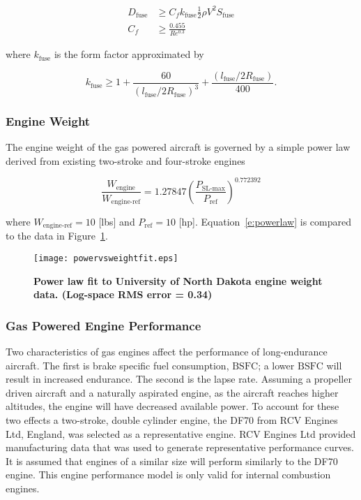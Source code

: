 \begin{align}
    \label{e:fusedrag}
    D_{\text{fuse}} &\geq C_f k_{\text{fuse}} \frac{1}{2} \rho V^2 S_{\text{fuse}} \\
    C_f &\geq \frac{0.455}{Re^{0.3}}
\end{align}

where $k_{\text{fuse}}$ is the form factor approximated by\cite{raymer}

\begin{equation}
    \label{e:fuseform}
    k_{\text{fuse}} \geq 1 + \frac{60}{(l_{\text{fuse}}/2R_{\text{fuse}})^3} + \frac{(l_{\text{fuse}}/2R_{\text{fuse}})}{400}.
\end{equation}

\subsubsection{Engine Weight}

The engine weight of the gas powered aircraft is governed by a simple power law derived from existing two-stroke and four-stroke engines\cite{gasengine}

\begin{equation}
    \label{e:powerlaw}
    \frac{W_{\text{engine}}}{W_{\text{engine-ref}}} = 1.27847 \left(\frac{P_{\text{SL-max}}}{P_{\text{ref}}} \right)^{0.772392}
\end{equation}

where $W_{\text{engine-ref}} = 10$ [lbs] and $P_{\text{ref}} = 10$ [hp].   
Equation~\eqref{e:powerlaw} is compared to the data in Figure~\ref{f:powervsweightfit}.

\begin{figure}[H]
	\begin{center}
	\texttt{[image: powervsweightfit.eps]}
    \caption{\textbf{Power law fit to University of North Dakota engine weight data\cite{gasengine}. (Log-space RMS error = 0.34)}}
	\label{f:powervsweightfit}
	\end{center}
\end{figure}

\subsubsection{Gas Powered Engine Performance}

Two characteristics of gas engines affect the performance of long-endurance aircraft.  
The first is brake specific fuel consumption, $\text{BSFC}$; a lower $\text{BSFC}$ will result in increased endurance.  
The second is the lapse rate.  
Assuming a propeller driven aircraft and a naturally aspirated engine, as the aircraft reaches higher altitudes, the engine will have decreased available power. 
To account for these two effects a two-stroke, double cylinder engine, the DF70 from RCV Engines Ltd, England, was selected as a representative engine.  
RCV Engines Ltd provided manufacturing data that was used to generate representative performance curves.\cite{rcvengines}
It is assumed that engines of a similar size will perform similarly to the DF70 engine.  
This engine performance model is only valid for internal combustion engines.

